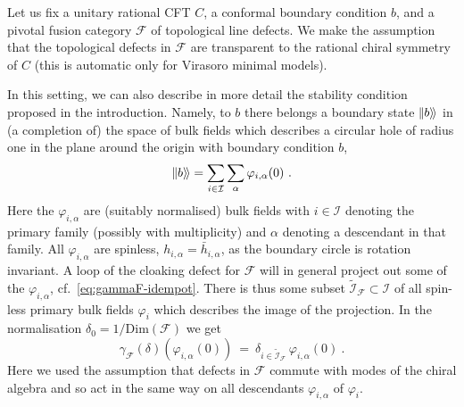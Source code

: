 \documentclass[11pt,a4paper]{article}
\numberwithin{equation}{section}
\def\ket#1{|{#1}\rangle}
\newcommand{\bndstate}[1]{|\hspace{-1pt}\ket{#1}\!\rangle}
\begin{document}
Let us fix a unitary rational CFT $C$, a conformal boundary condition $b$, and a pivotal fusion category $\mathcal{F}$ of topological line defects. 
We make the assumption that the topological defects in $\mathcal{F}$ are transparent to the rational chiral symmetry of $C$ (this is automatic only for Virasoro minimal models).

In this setting, we can also describe in more detail the stability condition proposed in the introduction. Namely, to $b$ there belongs a boundary state $\bndstate{b}$ in (a completion of) the space of bulk fields which describes a circular hole of radius one in the plane around the origin with boundary condition $b$,
\begin{equation}
    \bndstate{b} = \sum_{i \in \mathcal{I}} \sum_\alpha \varphi_{i,\alpha}(0) \ .
\end{equation}
Here the $\varphi_{i,\alpha}$ are (suitably normalised) bulk fields with $i\in \mathcal{I}$ denoting the primary family (possibly with multiplicity) and $\alpha$ denoting a descendant in that family. All $\varphi_{i,\alpha}$ are spinless, $h_{i,\alpha} = \bar h_{i,\alpha}$, as the boundary circle is rotation invariant.
A loop of the cloaking defect for $\mathcal{F}$ will in general project out some of the $\varphi_{i,\alpha}$, cf.\ \eqref{eq:gammaF-idempot}. There is thus some subset $\widetilde{\mathcal{I}}_{\mathcal{F}} \subset \mathcal{I}$ of all spin-less primary bulk fields $\varphi_i$ which describes the image of the projection. In the normalisation $\delta_0 = 1/\mathrm{Dim}(\mathcal{F})$ we get
\begin{equation}
    \gamma_\mathcal{F}(\delta)(\varphi_{i,\alpha}(0)) ~=~ \delta_{i \in \widetilde{\mathcal{I}}_{\mathcal{F}}} \, \varphi_{i,\alpha}(0) \ .
\end{equation}
Here we used the assumption that defects in $\mathcal{F}$ commute with modes of the chiral algebra and so act in the same way on all descendants $\varphi_{i,\alpha}$ of $\varphi_i$.
\end{document}
